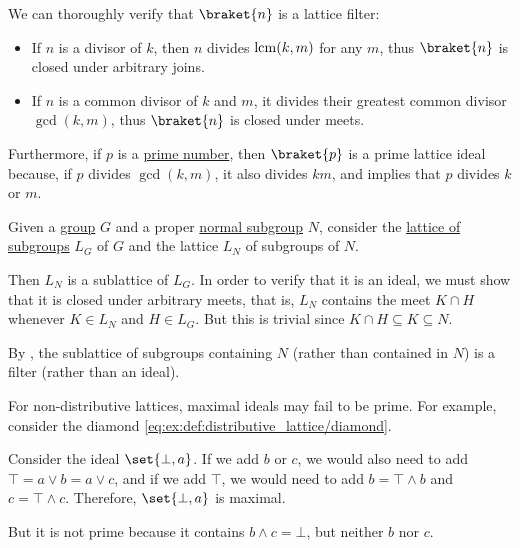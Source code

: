 \begin{example}
\begin{thmenum}
    We can thoroughly verify that \( \braket{ n } \) is a lattice filter:
    \begin{itemize}
      \item If \( n \) is a divisor of \( k \), then \( n \) divides \( \operatorname{lcm}(k, m) \) for any \( m \), thus \( \braket{ n } \) is closed under arbitrary joins.
      \item If \( n \) is a common divisor of \( k \) and \( m \), it divides their greatest common divisor \( \gcd(k, m) \), thus \( \braket{ n } \) is closed under meets.
    \end{itemize}

    Furthermore, if \( p \) is a \hyperref[def:prime_number]{prime number}, then \( \braket{ p } \) is a prime lattice ideal because, if \( p \) divides \( \gcd(k, m) \), it also divides \( km \), and  implies that \( p \) divides \( k \) or \( m \).

     Given a \hyperref[def:group]{group} \( G \) and a proper \hyperref[def:normal_subgroup]{normal subgroup} \( N \), consider the \hyperref[thm:substructures_form_complete_lattice]{lattice of subgroups} \( L_G \) of \( G \) and the lattice \( L_N \) of subgroups of \( N \).

    Then \( L_N \) is a sublattice of \( L_G \). In order to verify that it is an ideal, we must show that it is closed under arbitrary meets, that is, \( L_N \) contains the meet \( K \cap H \) whenever \( K \in L_N \) and \( H \in L_G \). But this is trivial since \( K \cap H \subseteq K \subseteq N \).

    By , the sublattice of subgroups containing \( N \) (rather than contained in \( N \)) is a filter (rather than an ideal).

     For non-distributive lattices, maximal ideals may fail to be prime. For example, consider the diamond \eqref{eq:ex:def:distributive_lattice/diamond}.

    Consider the ideal \( \set{ \bot, a } \). If we add \( b \) or \( c \), we would also need to add \( \top = a \vee b = a \vee c \), and if we add \( \top \), we would need to add \( b = \top \wedge b \) and \( c = \top \wedge c \). Therefore, \( \set{ \bot, a } \) is maximal.

    But it is not prime because it contains \( b \wedge c = \bot \), but neither \( b \) nor \( c \).
  \end{thmenum}
\end{example}

